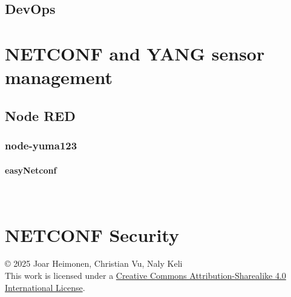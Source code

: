 \documentclass[12pt]{article}
\newcommand{\subsubsubsection}[1]{\paragraph{#1}\mbox{}\\}
\newcommand{\license}{
    \vspace{1em}
    \noindent\small{© 2025 Joar Heimonen,  Christian Vu, Naly Keli\\
    This work is licensed under a \href{https://creativecommons.org/licenses/by-sa/4.0/}{Creative Commons Attribution-Sharealike 4.0 International License}.}
}
\begin{document}
\subsection{DevOps}


\section{NETCONF and YANG sensor management}

\subsection{Node RED}
\subsubsection{node-yuma123}
\subsubsubsection{easyNetconf}

\section{NETCONF Security}

\pagebreak
{}
\printbibliography
\license
\end{document}
